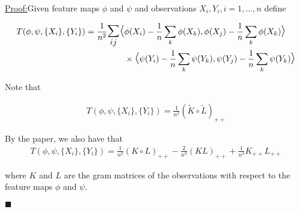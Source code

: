 \documentclass{article}
\newenvironment{claimproof}[1]{\par\noindent\underline{Proof:}\space#1}{\hfill $\blacksquare$}
\begin{document}
\begin{claimproof}
Given feature maps $\phi$ and $\psi$ and observations $X_i, Y_i, i=1,\ldots,n$ define 

\begin{align*}
T(\phi, \psi, \{X_i\},\{Y_i\}) = \frac{1}{n^2} \mathlarger{\mathlarger{\sum_{ij}}} \mathlarger{\mathlarger{\langle}} & \phi(X_i) - \frac{1}{n}\sum_k \phi(X_k), \phi(X_j) - \frac{1}{n}\sum_k \phi(X_k) \mathlarger{\mathlarger{\rangle}} \\ &\times \mathlarger{\mathlarger{\langle}} \psi(Y_i) - \frac{1}{n}\sum_k \psi(Y_k), \psi(Y_j) - \frac{1}{n}\sum_k \psi(Y_k) \mathlarger{\mathlarger{\rangle}}
\end{align*}

Note that 

\begin{align*}
T(\phi, \psi, \{X_i\},\{Y_i\}) = \frac{1}{n^2} (\tilde{K}\circ \tilde{L})_{++}
\end{align*}

By the paper, we also have that 
\begin{align*}
T(\phi, \psi, \{X_i\},\{Y_i\}) = \frac{1}{n^2}(K\circ L)_{++} - \frac{2}{n^3}(KL)_{++} + \frac{1}{n^4}K_{++}L_{++}
\end{align*}

where $K$ and $L$ are the gram matrices of the observations with respect to the feature maps $\phi$ and $\psi$.


\end{claimproof}
\end{document}
